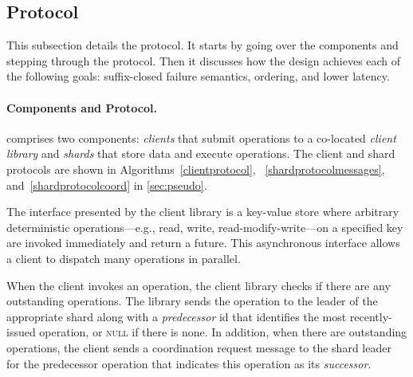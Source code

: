 

\subsection{Protocol}
This subsection details the \sys{} protocol.
It starts by going over the components and stepping through the protocol.
Then it discusses how the design achieves each of the following goals:
suffix-closed failure semantics,
\mdl{} ordering,
and lower latency.

\paragraph{Components and Protocol.}
\sys{} comprises two components: \textit{clients} that submit operations to a co-located \textit{client library} and \textit{shards} that store data and execute operations.
The client and shard protocols are shown in Algorithms~\ref{clientprotocol}, ~\ref{shardprotocolmessages}, and~\ref{shardprotocolcoord} in \cref{sec:pseudo}.


The interface presented by the client library is a key-value store where arbitrary deterministic operations---e.g., read, write, read-modify-write---on a specified key are invoked immediately and return a future.
This asynchronous interface allows a client to dispatch many operations in parallel.


When the client invokes an operation, the client library checks if there are any
outstanding operations.  The library sends the operation to the leader of the
appropriate shard along with a \textit{predecessor} id that identifies the most
recently-issued operation, or \textsc{null} if there is none.  In addition, when
there are outstanding operations, the client sends a coordination request
message to the shard leader for the predecessor operation that indicates this
operation as its \textit{successor}.


